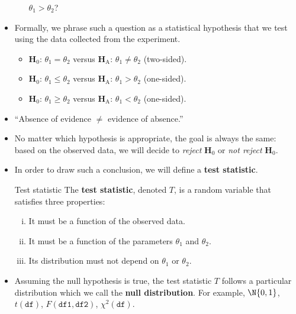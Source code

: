 \begin{itemize}
\begin{itemize}
                        $ \theta_1>\theta_2 $?
            \end{itemize}
      \item Formally, we phrase such a question as a statistical hypothesis that we test using
            the data collected from the experiment.
            \begin{itemize}
                  \item $ \mathbf{H}_0 $: $ \theta_1=\theta_2 $ versus $ \mathbf{H}_\text{A} $: $ \theta_1\ne\theta_2 $ (two-sided).
                  \item $ \mathbf{H}_0 $: $ \theta_1\le\theta_2 $ versus $ \mathbf{H}_\text{A} $: $ \theta_1>\theta_2 $ (one-sided).
                  \item $ \mathbf{H}_0 $: $ \theta_1\ge\theta_2 $ versus $ \mathbf{H}_\text{A} $: $ \theta_1<\theta_2 $ (one-sided).
            \end{itemize}
      \item ``Absence of evidence $ \ne  $ evidence of absence.''
      \item No matter which hypothesis is appropriate, the goal is always the same: based on the
            observed data, we will decide to \emph{reject} $ \mathbf{H}_0 $ or \emph{not reject} $ \mathbf{H}_0 $.
      \item In order to draw such a conclusion, we will define a \textbf{test statistic}.
            \begin{Definition}{Test statistic}{}
                  The \textbf{test statistic}, denoted $ T $,
                  is a random variable that satisfies three properties:
                  \begin{enumerate}[(i)]
                        \item It must be a function of the observed data.
                        \item It must be a function of the parameters $ \theta_1 $ and $ \theta_2 $.
                        \item Its distribution must not depend on $ \theta_1 $ or $ \theta_2 $.
                  \end{enumerate}
            \end{Definition}
      \item Assuming the null hypothesis is true, the test statistic $ T $ follows
            a particular distribution which we call the \textbf{null distribution}.
            For example, $ \N{0,1} $, $ t(\texttt{df}) $,
            $ F(\texttt{df1}, \texttt{df2}) $, $ \chi^2(\texttt{df}) $.

\end{itemize}
